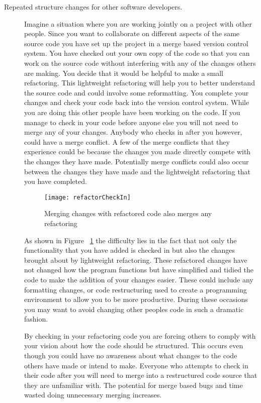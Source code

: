 \begin{description}
\item [Repeated structure changes for other software developers.]
Imagine a situation where you are working jointly on a project with other people. 
Since you want to collaborate on different aspects of the same source code you have set up the project in a merge based version control system.  
You have checked out your own copy of the code so that you can work on the source code without interfering with any of the changes others are making.
You decide that it would be helpful to make a small refactoring.
This lightweight refactoring will help you to better understand the source code and could involve some reformatting. 
You complete your changes and check your code back into the version control system.  
While you are doing this other people have been working on the code.  
If you manage to check in your code before anyone else you will not need to merge any of your changes.  
Anybody who checks in after you however, could have a merge conflict.  
A few of the merge conflicts that they experience could be because the changes you made directly compete with the changes they have made. 
Potentially merge conflicts could also occur between the changes they have made and the lightweight refactoring that you have completed. 
 

\begin{figure}[!t]
\begin{center}
\texttt{[image: refactorCheckIn]}
\end{center}
\caption{Merging changes with refactored code also merges any refactoring}
\label{fig:motMerge}
\end{figure}

As shown in Figure ~\ref{fig:motMerge} the difficulty lies in the fact that not only the functionality that you have added is checked in but also the changes brought about by lightweight refactoring.
These refactored changes have not changed how the program functions but have simplified and tidied the code to make the addition of your changes easier. 
These could include any formatting changes, or code restructuring used to create a programming environment to allow you to be more productive.  During these occasions you may want to avoid changing other peoples code in such a dramatic fashion.

By checking in your refactoring code you are forcing others to comply with your vision about how the code should be structured.  This occurs even though you could have no awareness about what changes to the code others have made or intend to make.  Everyone who attempts to check in their code after you will need to merge into a restructured code source that they are unfamiliar with.  The potential for merge based bugs and time wasted doing unnecessary merging increases.


\end{description}
